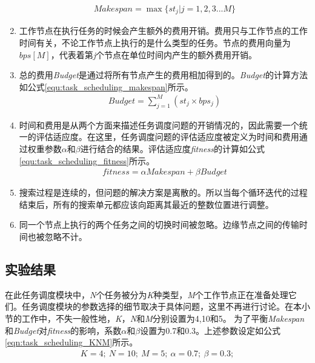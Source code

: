 \begin{enumerate}[]
    \begin{eqnarray}\label{equ:task_scheduling_makespan}
        Makespan=\max\{st_j | j=1,2,3...M\}
    \end{eqnarray}
    \item 工作节点在执行任务的时候会产生额外的费用开销。费用只与工作节点的工作时间有关，不论工作节点上执行的是什么类型的任务。节点的费用向量为$bps[M]$，代表着第\emph{j}个节点在单位时间内产生的额外费用开销。
    \item  总的费用\emph{Budget}是通过将所有节点产生的费用相加得到的。\emph{Budget}的计算方法如公式\ref{equ:task_scheduling_makespan}所示。
    \begin{eqnarray}\label{equ:task_scheduling_budget}
        Budget=\sum_{j=1}^{M} (st_j \times bps_j)
    \end{eqnarray}
    \item 时间和费用是从两个方面来描述任务调度问题的开销情况的，因此需要一个统一的评估适应度。在这里，任务调度问题的评估适应度被定义为时间和费用通过权重参数$\alpha$和$\beta$进行结合的结果。评估适应度\emph{fitness}的计算如公式\ref{equ:task_scheduling_fitness}所示。
    \begin{eqnarray}\label{equ:task_scheduling_fitness}
        fitness=\alpha Makespan + \beta Budget
    \end{eqnarray}
    \item 搜索过程是连续的，但问题的解决方案是离散的。所以当每个循环迭代的过程结束后，所有的搜索单元都应该向距离其最近的整数位置进行调整。
    \item 同一个节点上执行的两个任务之间的切换时间被忽略。边缘节点之间的传输时间也被忽略不计。
\end{enumerate}
\subsection{实验结果}
在此任务调度模块中，\emph{N}个任务被分为\emph{K}种类型，\emph{M}个工作节点正在准备处理它们。任务调度模块的参数选择的细节取决于具体问题，这里不再进行讨论。在本小节的工作中，不失一般性地，\emph{K}，\emph{N}和\emph{M}分别设置为4,10和5。 为了平衡\emph{Makespan}和\emph{Budget}对\emph{fitness}的影响，系数$\alpha$和$\beta$设置为0.7和0.3。上述参数设定如公式\ref{eqn:task_scheduling_KNM}所示。
\begin{eqnarray}\label{eqn:task_scheduling_KNM}
    K=4;\ N=10;\ M=5;\ \alpha=0.7;\ \beta=0.3; 
\end{eqnarray}

